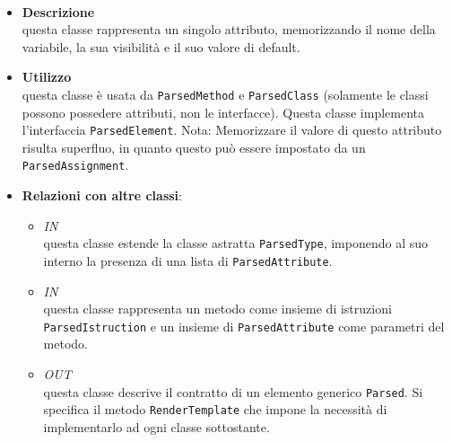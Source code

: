 \paragraph{}
\label{\nogloxy{SWEDesigner::Server::Project::ParsedAttribute}}
\begin{itemize}
\item \textbf{Descrizione}\\
questa classe rappresenta un singolo attributo, memorizzando il nome della variabile, la sua visibilità e il suo valore di default. 
\item \textbf{Utilizzo}\\
questa classe è usata da \texttt{ParsedMethod} e \texttt{ParsedClass} (solamente le classi possono possedere attributi, non le interfacce).
Questa classe implementa l'interfaccia \texttt{ParsedElement}.
Nota: Memorizzare il valore di questo attributo risulta superfluo, in quanto questo può essere impostato da un \texttt{ParsedAssignment}. 

\item \textbf{Relazioni con altre classi}:
\begin{itemize}
\item \textit{IN} \hyperref[\nogloxy{SWEDesigner::Server::Project::ParsedClass}]{}\\
questa classe estende la classe astratta \texttt{ParsedType}, imponendo al suo interno la presenza di una lista di \texttt{ParsedAttribute}. 
\item \textit{IN} \hyperref[\nogloxy{SWEDesigner::Server::Project::ParsedMethod}]{}\\
questa classe rappresenta un metodo come insieme di istruzioni \texttt{ParsedIstruction} e un insieme di \texttt{ParsedAttribute} come parametri del metodo.
\item \textit{OUT} \hyperref[\nogloxy{SWEDesigner::Server::Project::ParsedElement}]{}\\
questa classe descrive il contratto di un elemento generico \texttt{Parsed}. Si specifica il metodo \texttt{RenderTemplate} che impone la necessità di implementarlo ad ogni classe sottostante.
\end{itemize}
\end{itemize}

